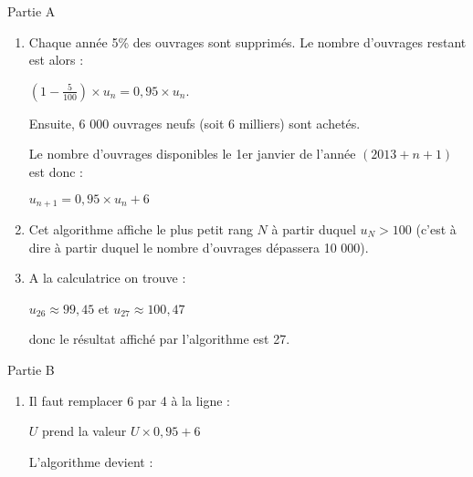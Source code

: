 \begin{corrige}
     \begin{h3}Partie A\end{h3}
     \begin{enumerate}
          \item
          Chaque année 5\% des ouvrages sont supprimés. Le nombre d'ouvrages restant est alors :
          \par
          $\left(1-\frac{5}{100}\right) \times  u_{n} = 0,95\times  u_{n} $.
          \par
          Ensuite, 6 000 ouvrages neufs (soit 6 milliers) sont achetés.
          \par
          Le nombre d'ouvrages disponibles le 1er  janvier de l'année $\left(2013+n+1\right)$ est donc :
          \begin{center}$u_{n+1}=0,95\times  u_{n} +6$\end{center}
          \item
          Cet algorithme affiche le plus petit rang $N$ à partir duquel $u_{N}  > 100$ (c'est à dire à partir duquel le nombre d'ouvrages dépassera 10 000).
          \item
          A la calculatrice on trouve :
          \par
          $u_{26} \approx  99,45$ et $u_{27} \approx  100,47$
          \par
          donc le résultat affiché par l'algorithme est  27.
     \end{enumerate}
     \begin{h3}Partie B\end{h3}
     \begin{enumerate}
          \item
          Il faut remplacer 6 par 4 à la ligne :
\par
          $U$ prend la valeur $U\times 0,95+6$
\par
     L'algorithme devient :


\end{enumerate}
\end{corrige}
